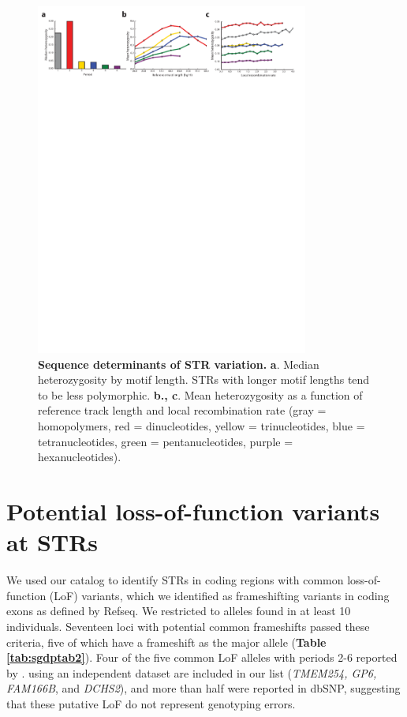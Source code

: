 \begin{figure}[h!]
\centering
\label{fig:sgdpfig4}
\includegraphics[width=0.8\textwidth]{Figures/App3/Fig4.pdf}
\caption{\textbf{Sequence determinants of STR variation.} \textbf{a}. Median heterozygosity by motif length. STRs with longer motif lengths tend to be less polymorphic. \textbf{b., c}. Mean heterozygosity as a function of reference track length and local recombination rate (gray = homopolymers, red = dinucleotides, yellow = trinucleotides, blue = tetranucleotides, green = pentanucleotides, purple = hexanucleotides).}
\end{figure}

\section{Potential loss-of-function variants at STRs}
We used our catalog to identify STRs in coding regions with common loss-of-function (LoF) variants, which we identified as frameshifting variants in coding exons as defined by Refseq. We restricted to alleles found in at least 10 individuals. Seventeen loci with potential common frameshifts passed these criteria, five of which have a frameshift as the major allele (\textbf{Table \ref{tab:sgdptab2}}). Four of the five common LoF alleles with periods 2-6 reported by \cite{WillemsGymrekHighnamEtAl2014}. using an independent dataset are included in our list (\emph{TMEM254, GP6, FAM166B}, and \emph{DCHS2}), and more than half were reported in dbSNP, suggesting that these putative LoF do not represent genotyping errors. 

